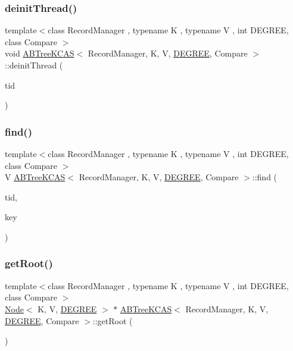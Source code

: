 \subsubsection{\texorpdfstring{deinit\+Thread()}{deinitThread()}}
{\footnotesize\ttfamily template$<$class Record\+Manager , typename K , typename V , int D\+E\+G\+R\+EE, class Compare $>$ \\
void \hyperlink{classABTreeKCAS}{A\+B\+Tree\+K\+C\+AS}$<$ Record\+Manager, K, V, \hyperlink{brown__sigouin__abtree__kcas_2adapter_8h_a5d88b17d70c985f2f2b8e987037fd6dd}{D\+E\+G\+R\+EE}, Compare $>$\+::deinit\+Thread (\begin{DoxyParamCaption}\item[{const int}]{tid }\end{DoxyParamCaption})}

\mbox{\label{classABTreeKCAS_aa1c24f0116a4a83ef37fd75a2b129d94}} 
\subsubsection{\texorpdfstring{find()}{find()}}
{\footnotesize\ttfamily template$<$class Record\+Manager , typename K , typename V , int D\+E\+G\+R\+EE, class Compare $>$ \\
V \hyperlink{classABTreeKCAS}{A\+B\+Tree\+K\+C\+AS}$<$ Record\+Manager, K, V, \hyperlink{brown__sigouin__abtree__kcas_2adapter_8h_a5d88b17d70c985f2f2b8e987037fd6dd}{D\+E\+G\+R\+EE}, Compare $>$\+::find (\begin{DoxyParamCaption}\item[{const int}]{tid,  }\item[{const K \&}]{key }\end{DoxyParamCaption})}

\mbox{\label{classABTreeKCAS_afdec82be1b5a8694c04e242549e4dff3}} 
\subsubsection{\texorpdfstring{get\+Root()}{getRoot()}}
{\footnotesize\ttfamily template$<$class Record\+Manager , typename K , typename V , int D\+E\+G\+R\+EE, class Compare $>$ \\
\hyperlink{classNode}{Node}$<$ K, V, \hyperlink{brown__sigouin__abtree__kcas_2adapter_8h_a5d88b17d70c985f2f2b8e987037fd6dd}{D\+E\+G\+R\+EE} $>$ $\ast$ \hyperlink{classABTreeKCAS}{A\+B\+Tree\+K\+C\+AS}$<$ Record\+Manager, K, V, \hyperlink{brown__sigouin__abtree__kcas_2adapter_8h_a5d88b17d70c985f2f2b8e987037fd6dd}{D\+E\+G\+R\+EE}, Compare $>$\+::get\+Root (\begin{DoxyParamCaption}\item[{void}]{ }\end{DoxyParamCaption})\hspace{0.3cm}{\ttfamily [inline]}}

